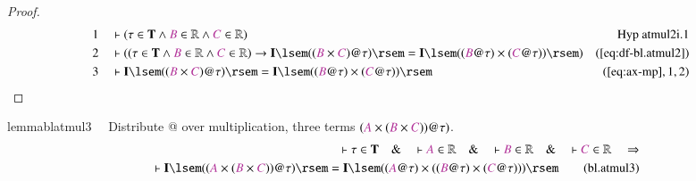 \begin{proof}
\begin{align}
  1 &&  & \vdash ( \tau \in \mathbf{T} \wedge \mc{B} \in \mathbb{R} \wedge
      \mc{C} \in \mathbb{R}
      )&\text{Hyp~atmul2i.1}\notag%
  \\ 2 &&  & \vdash ( ( \tau \in \mathbf{T} \wedge \mc{B} \in \mathbb{R} \wedge
      \mc{C} \in \mathbb{R} ) \rightarrow \mathbf{I} \lsem
      ( ( \mc{B} \times \mc{C} ) @ \tau ) \rsem = \mathbf{I}
      \lsem ( ( \mc{B} @ \tau ) \times ( \mc{C} @ \tau ) )
      \rsem )&(\mbox{\ref{eq:df-bl.atmul2}})\notag
  \\ 3 &&  & \vdash \mathbf{I} \lsem ( ( \mc{B} \times \mc{C} ) @ \tau ) \rsem =
      \mathbf{I} \lsem ( ( \mc{B} @ \tau ) \times ( \mc{C} @
      \tau ) ) \rsem&(\mbox{\ref{eq:ax-mp}},1,2)\notag
\end{align}
\end{proof}

\begin{restatable}{lemma}{blatmul3}~~ Distribute @ over multiplication, three
terms $( \mc{A} \times ( \mc{B} \times \mc{C} ) ) @ \tau )$.
\begin{align}
\vdash \tau \in \mathbf{T}\quad\&\quad \vdash \mc{A} \in \mathbb{R}\quad\&\quad
    \vdash \mc{B} \in \mathbb{R}\quad\&\quad \vdash \mc{C} \in
    \mathbb{R}\quad\Rightarrow \notag \\ %
      \quad \vdash \mathbf{I} \lsem ( ( \mc{A} \times (
    \mc{B} \times \mc{C} ) ) @ \tau ) \rsem = \mathbf{I} \lsem ( ( \mc{A} @ \tau
    ) \times ( ( \mc{B} @ \tau ) \times ( \mc{C} @ \tau ) ) )
    \rsem\label{eq:bl.atmul3}\tag{bl.atmul3}
\end{align}
\end{restatable}

